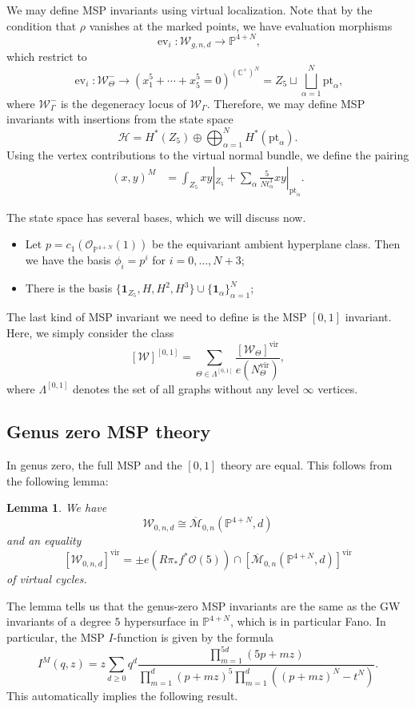 \documentclass[10pt]{amsart}
\newtheorem{lem}[thm]{Lemma}
\theoremstyle{definition}
\theoremstyle{remark}
\theoremstyle{plain}
\theoremstyle{definition}
\theoremstyle{remark}
\newcommand{\C}{\mathbb{C}}
\renewcommand{\P}{\mathbb{P}}
\newcommand{\Mbar}{\overline{\mathcal{M}}}
\newcommand{\mc}[1]{\mathcal{#1}}
\newcommand{\mr}[1]{\mathrm{#1}}
\newcommand{\1}{\mathbf{1}}
\newcommand{\2}{\mathbf{2}}
\newcommand{\3}{\mathbf{3}}
\newcommand{\vir}{\mr{vir}}
\newcommand{\pt}{\mr{pt}}
\DeclareMathOperator{\ev}{ev}
\begin{document}
We may define MSP invariants using virtual localization. Note that by the condition that $\rho$ vanishes at the marked points, we have evaluation morphisms
\[ \ev_i \colon \mc{W}_{g,n,d} \to \P^{4+N}, \]
which restrict to
\[ \ev_i \colon \mc{W}_{\Theta}^- \to (x_1^5 + \cdots + x_5^5 = 0)^{(\C^{\times})^N} = Z_5 \sqcup \bigsqcup_{\alpha=1}^N \pt_{\alpha}, \]
where $\mc{W}^-_{\Gamma}$ is the degeneracy locus of $\mc{W}_{\Gamma}$. Therefore, we may define MSP invariants with insertions from the state space
\[ \mc{H} = H^*(Z_5) \oplus \bigoplus_{\alpha=1}^N H^*(\pt_{\alpha}). \]
Using the vertex contributions to the virtual normal bundle, we define the pairing
\begin{align*}
    (x,y)^M &= \int_{Z_5} xy|_{ Z_5 } + \sum_{\alpha} \frac{5}{N t_{\alpha}^3} xy |_{\pt_{\alpha}}.
\end{align*}

The state space has several bases, which we will discuss now.
\begin{itemize}
    \item Let $p = c_1(\mc{O}_{\P^{4+N}}(1))$ be the equivariant ambient hyperplane class. Then we have the basis $\phi_i = p^i$ for $i=0,\ldots, N+3$;
    \item There is the basis $\{ \1_{Z_5},H,H^2,H^3 \}\cup \{ \1_{\alpha} \}_{\alpha=1}^N$;
\end{itemize}

The last kind of MSP invariant we need to define is the MSP $[0,1]$ invariant. Here, we simply consider the class
\[ [\mc{W}]^{[0,1]} = \sum_{\Theta \in \Lambda^{[0,1]}} \frac{[\mc{W}_{\Theta}]^{\vir}}{e(N_{\Theta}^{\vir})}, \]
where $\Lambda^{[0,1]}$ denotes the set of all graphs without any level $\infty$ vertices.

\subsection{Genus zero MSP theory}%
\label{sub:Genus zero MSP theory}

In genus zero, the full MSP and the $[0,1]$ theory are equal. This follows from the following lemma:
\begin{lem}
    We have
    \[ \mc{W}_{0,n,d} \cong \Mbar_{0,n}(\P^{4+N}, d) \]
    and an equality
    \[ [\mc{W}_{0,n,d}]^{\vir} = \pm e(R\pi_* f^* \mc{O}(5)) \cap [\Mbar_{0,n}(\P^{4+N},d)]^{\vir} \]
    of virtual cycles.
\end{lem}
The lemma tells us that the genus-zero MSP invariants are the same as the GW invariants of a degree $5$ hypersurface in $\P^{4+N}$, which is in particular Fano. In particular,
the MSP $I$-function is given by the formula
\[ I^M(q,z) = z \sum_{d \geq 0} q^d \frac{\prod_{m=1}^{5d} (5p+mz)}{\prod_{m=1}^d (p+mz)^5 \prod_{m=1}^d ((p+mz)^N - t^N)}. \]
This automatically implies the following result.
\end{document}
